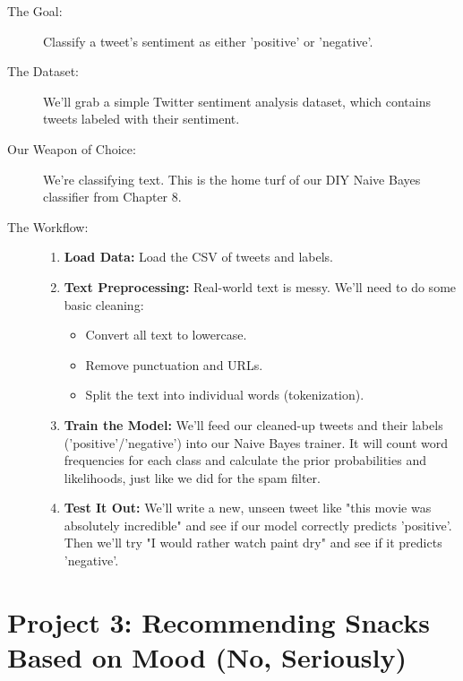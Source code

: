 \documentclass[11pt, letterpaper, openany]{book}
\begin{document}
\begin{description}
    \item[The Goal:] Classify a tweet's sentiment as either 'positive' or 'negative'.
    \item[The Dataset:] We'll grab a simple Twitter sentiment analysis dataset, which contains tweets labeled with their sentiment.
    \item[Our Weapon of Choice:] We're classifying text. This is the home turf of our DIY Naive Bayes classifier from Chapter 8.
    \item[The Workflow:]
    \begin{enumerate}
        \item \textbf{Load Data:} Load the CSV of tweets and labels.
        \item \textbf{Text Preprocessing:} Real-world text is messy. We'll need to do some basic cleaning:
        \begin{itemize}
            \item Convert all text to lowercase.
            \item Remove punctuation and URLs.
            \item Split the text into individual words (tokenization).
        \end{itemize}
        \item \textbf{Train the Model:} We'll feed our cleaned-up tweets and their labels ('positive'/'negative') into our Naive Bayes trainer. It will count word frequencies for each class and calculate the prior probabilities and likelihoods, just like we did for the spam filter.
        \item \textbf{Test It Out:} We'll write a new, unseen tweet like "this movie was absolutely incredible" and see if our model correctly predicts 'positive'. Then we'll try "I would rather watch paint dry" and see if it predicts 'negative'.
    \end{enumerate}
\end{description}

\section{Project 3: Recommending Snacks Based on Mood (No, Seriously)}
\end{document}
